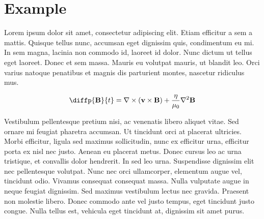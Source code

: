 \chapter{Example}

Lorem ipsum dolor sit amet, consectetur adipiscing elit. Etiam efficitur a sem a mattis. Quisque tellus nunc, accumsan eget dignissim quis, condimentum eu mi. In sem magna, lacinia non commodo id, laoreet id dolor. Nunc dictum ut tellus eget laoreet. Donec et sem massa. Mauris eu volutpat mauris, ut blandit leo. Orci varius natoque penatibus et magnis dis parturient montes, nascetur ridiculus mus.

\begin{equation}
    \diffp{\vect{B}}{t} = \nabla\times(\vect{v}\times\vect{B})+\frac{\eta}{\mu_0}\nabla^2\vect{B}
\end{equation}

Vestibulum pellentesque pretium nisi, ac venenatis libero aliquet vitae. Sed ornare mi feugiat pharetra accumsan. Ut tincidunt orci at placerat ultricies. Morbi efficitur, ligula sed maximus sollicitudin, nunc ex efficitur urna, efficitur porta ex nisl nec justo. Aenean eu placerat metus. Donec cursus leo ac urna tristique, et convallis dolor hendrerit. In sed leo urna. Suspendisse dignissim elit nec pellentesque volutpat. Nunc nec orci ullamcorper, elementum augue vel, tincidunt odio. Vivamus consequat consequat massa. Nulla vulputate augue in neque feugiat dignissim. Sed maximus vestibulum lectus nec gravida. Praesent non molestie libero. Donec commodo ante vel justo tempus, eget tincidunt justo congue. Nulla tellus est, vehicula eget tincidunt at, dignissim sit amet purus.